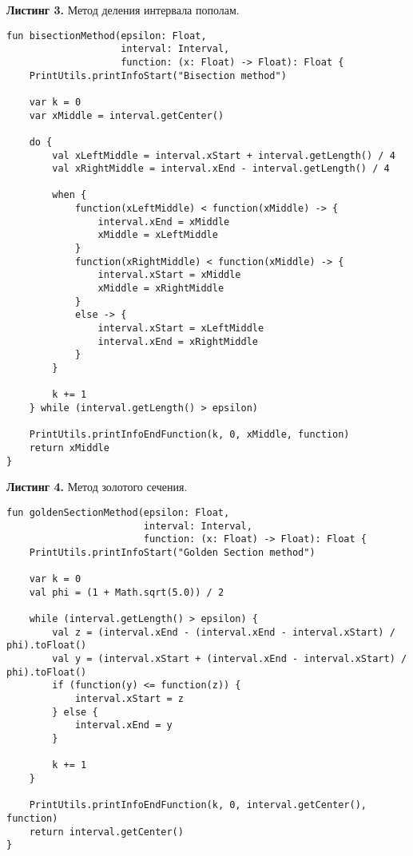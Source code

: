 \documentclass[a4paper, 12pt]{article}   	%
\begin{document}
    \textbf{Листинг 3.} Метод деления интервала пополам.
    \begin{verbatim}
fun bisectionMethod(epsilon: Float,
                    interval: Interval,
                    function: (x: Float) -> Float): Float {
    PrintUtils.printInfoStart("Bisection method")

    var k = 0
    var xMiddle = interval.getCenter()

    do {
        val xLeftMiddle = interval.xStart + interval.getLength() / 4
        val xRightMiddle = interval.xEnd - interval.getLength() / 4

        when {
            function(xLeftMiddle) < function(xMiddle) -> {
                interval.xEnd = xMiddle
                xMiddle = xLeftMiddle
            }
            function(xRightMiddle) < function(xMiddle) -> {
                interval.xStart = xMiddle
                xMiddle = xRightMiddle
            }
            else -> {
                interval.xStart = xLeftMiddle
                interval.xEnd = xRightMiddle
            }
        }

        k += 1
    } while (interval.getLength() > epsilon)

    PrintUtils.printInfoEndFunction(k, 0, xMiddle, function)
    return xMiddle
}
    \end{verbatim}
    
    \textbf{Листинг 4.} Метод золотого сечения.
    \begin{verbatim}
fun goldenSectionMethod(epsilon: Float,
                        interval: Interval,
                        function: (x: Float) -> Float): Float {
    PrintUtils.printInfoStart("Golden Section method")

    var k = 0
    val phi = (1 + Math.sqrt(5.0)) / 2

    while (interval.getLength() > epsilon) {
        val z = (interval.xEnd - (interval.xEnd - interval.xStart) / phi).toFloat()
        val y = (interval.xStart + (interval.xEnd - interval.xStart) / phi).toFloat()
        if (function(y) <= function(z)) {
            interval.xStart = z
        } else {
            interval.xEnd = y
        }

        k += 1
    }

    PrintUtils.printInfoEndFunction(k, 0, interval.getCenter(), function)
    return interval.getCenter()
}
    \end{verbatim}
    
\end{document}
